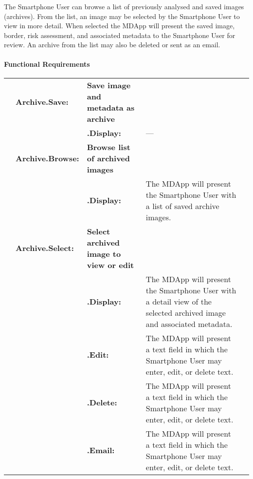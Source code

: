 {            The Smartphone User can browse a list of previously analysed and saved images (archives). From the list, an image may be selected by the Smartphone User to view in more detail. When selected the MDApp will present the saved image, border, risk assessment, and associated metadata to the Smartphone User for review. An archive from the list may also be deleted or sent as an email.

            \paragraph{Functional Requirements}
                \begin{longtable}[H]{ >{\bfseries}l >{\bfseries}l >{\bfseries}l p{8.5cm} l }

                    \hline

                    & \multicolumn{2}{>{\bfseries}l}
                    {Archive.Save:} & \textbf{Save image and metadata as archive}  \\

                    & & .Display: &
                    ---
                    \\
                    \hline
                    & \multicolumn{2}{>{\bfseries}l}
                    {Archive.Browse:} & \textbf{Browse list of archived images}  \\

                    & & .Display: &
                    The MDApp will present the Smartphone User with a list of saved archive images.
                    \\
                    \hline
                    & \multicolumn{2}{>{\bfseries}l}
                    {Archive.Select:} & \textbf{Select archived image to view or edit}  \\

                    & & .Display: &
                    The MDApp will present the Smartphone User with a detail view of the selected archived image and associated metadata.
                    \\
                    & & .Edit: &
                    The MDApp will present a text field in which the Smartphone User may enter, edit, or delete text.
                    \\
                    & & .Delete: &
                    The MDApp will present a text field in which the Smartphone User may enter, edit, or delete text.
                    \\
                    & & .Email: &
                    The MDApp will present a text field in which the Smartphone User may enter, edit, or delete text.
                    \\


                    \hline
                \end{longtable}
}

